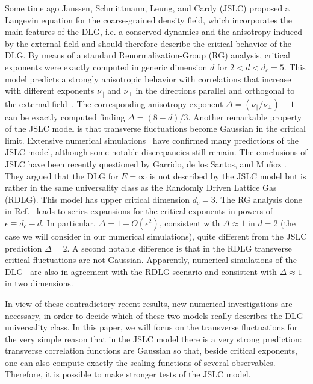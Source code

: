\documentclass[aps,prl,twocolumn,floatfix,amssymb]{revtex4}
\newcommand{\pe}[1]{#1_{\bot}}
\newcommand{\pa}[1]{#1_{\|}}
\begin{document}
Some time ago Janssen, Schmittmann, 
Leung, and Cardy \cite{Janssen86a} (JSLC) proposed a 
Langevin equation for the coarse-grained density field, 
which incorporates the main features of the DLG, i.e. 
a conserved dynamics and the anisotropy induced by the external 
field and should therefore describe the critical behavior of the 
DLG. By means of a standard Renormalization-Group (RG) analysis, 
critical exponents were exactly computed in generic 
dimension $d$ for $2<d<d_{c}=5$. 
This model predicts a strongly anisotropic 
behavior with correlations that increase with different exponents 
$\pa{\nu}$ and $\pe{\nu}$ 
in the directions parallel and orthogonal to the external field~\cite{Zia}. 
The corresponding anisotropy exponent $\Delta =(\pa{\nu}/\pe{\nu})-1$ 
can be exactly computed finding $\Delta = (8-d)/3$. Another remarkable 
property of the JSLC model is that transverse fluctuations become 
Gaussian in the critical limit. Extensive numerical simulations~\cite{china} 
have confirmed many predictions of the JSLC model, although 
some notable discrepancies still remain. 
The conclusions of JSLC have been recently questioned by 
Garrido, de los Santos, and Mu\~noz \cite{Garrido}. 
They argued that the DLG for $E=\infty$ is not described 
by the JSLC model but is rather in the same universality class 
as the Randomly Driven Lattice Gas (RDLG). 
This model has upper critical dimension $d_{c}=3$. The RG analysis done in 
Ref.~\cite{RDLG} leads to series expansions for the critical exponents in 
powers of $\epsilon\equiv d_{c}-d$. In particular, $\Delta = 1 + O(\epsilon^2)$, 
consistent with $\Delta\approx 1$ in $d=2$ (the case we will consider in our numerical simulations), quite different from the JSLC 
prediction $\Delta=2$. A second notable difference is that in the RDLG 
transverse critical fluctuations are not Gaussian. 
Apparently, numerical simulations of the DLG~\cite{AGMM} are also 
in agreement with the RDLG scenario and consistent with $\Delta\approx 1$ 
in two dimensions. 
 
In view of these contradictory recent results, 
new numerical investigations are necessary, 
in order to decide which of these two models really describes the DLG universality class. 
In this paper, we will focus on the transverse fluctuations for the 
very simple reason that in the JSLC model there is a very strong prediction: 
transverse correlation functions are Gaussian so that, 
beside critical exponents, one can also compute exactly 
the scaling functions of several observables. 
Therefore, it is possible to make stronger tests of the 
JSLC model. 
 
\end{document}
